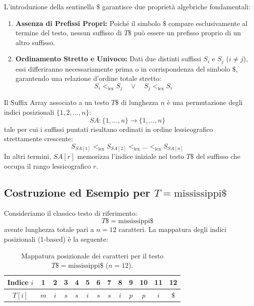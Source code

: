 L'introduzione della sentinella $\$$ garantisce due propriet\`a algebriche fondamentali:
\begin{enumerate}
  \item \textbf{Assenza di Prefissi Propri:} Poich\'e il simbolo $\$$ compare esclusivamente al termine del testo, nessun suffisso di $T\$$ pu\`o essere un prefisso proprio di un altro suffisso.
  \item \textbf{Ordinamento Stretto e Univoco:} Dati due distinti suffissi $S_i$ e $S_j$ ($i \neq j$), essi differiranno necessariamente prima o in corrispondenza del simbolo $\$$, garantendo una relazione d'ordine totale stretto:
  \begin{equation}
    S_i <_{\text{lex}} S_j \quad \lor \quad S_j <_{\text{lex}} S_i
  \end{equation}
\end{enumerate}

\begin{definition}
Il Suffix Array associato a un testo $T\$$ di lunghezza $n$ \`e una permutazione degli indici posizionali $\{1, 2, \dots, n\}$:
\begin{equation}
  SA: \{1, \dots, n\} \to \{1, \dots, n\}
\end{equation}
tale per cui i suffissi puntati risultano ordinati in ordine lessicografico strettamente crescente:
\begin{equation}
  S_{SA[1]} <_{\text{lex}} S_{SA[2]} <_{\text{lex}} \dots <_{\text{lex}} S_{SA[n]}
\end{equation}
In altri termini, $SA[r]$ memorizza l'indice iniziale nel testo $T\$$ del suffisso che occupa il rango lessicografico $r$.
\end{definition}

\FloatBarrier
\subsection{Costruzione ed Esempio per $T = \text{mississippi}\$$}
\label{subsec:esempio-mississippi-sa}

Consideriamo il classico testo di riferimento:
\begin{equation}
  T\$ = \text{mississippi}\$
\end{equation}
avente lunghezza totale pari a $n = 12$ caratteri. La mappatura degli indici posizionali (1-based) \`e la seguente:

\begin{table}[H]
\centering
\small
\begin{tabular}{c c c c c c c c c c c c c}
\toprule
\textbf{Indice $i$} & 1 & 2 & 3 & 4 & 5 & 6 & 7 & 8 & 9 & 10 & 11 & 12 \\
\midrule
\textbf{$T[i]$} & $m$ & $i$ & $s$ & $s$ & $i$ & $s$ & $s$ & $i$ & $p$ & $p$ & $i$ & $\$$ \\
\bottomrule
\end{tabular}
\caption{Mappatura posizionale dei caratteri per il testo $T\$ = \text{mississippi}\$$ ($n = 12$).}
\label{tab:mississippi-posizionale}
\end{table}

